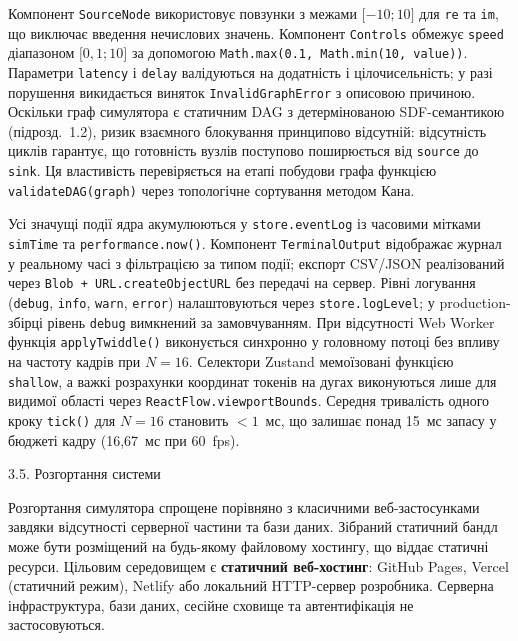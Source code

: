 \documentclass[
]{article}
\begin{document}
Компонент \texttt{SourceNode} використовує повзунки з межами
\(\lbrack - 10;10\rbrack\) для \texttt{re} та \texttt{im}, що виключає
введення нечислових значень. Компонент \texttt{Controls} обмежує
\texttt{speed} діапазоном \(\lbrack 0,1;10\rbrack\) за допомогою
\texttt{Math.max}\texttt{(0.1,\ }\texttt{Math.min}\texttt{(10,\ }\texttt{value}\texttt{))}.
Параметри \texttt{latency} і \texttt{delay} валідуються на додатність і
цілочисельність; у разі порушення викидається виняток
\texttt{InvalidGraphError} з описовою причиною. Оскільки граф симулятора
є статичним DAG з детермінованою SDF-семантикою (підрозд.~1.2), ризик
взаємного блокування принципово відсутній: відсутність циклів гарантує,
що готовність вузлів поступово поширюється від \texttt{source} до
\texttt{sink}. Ця властивість перевіряється на етапі побудови графа
функцією \texttt{validateDAG}\texttt{(}\texttt{graph}\texttt{)} через
топологічне сортування методом Кана.

Усі значущі події ядра акумулюються у \texttt{store.eventLog} із
часовими мітками \texttt{simTime} та
\texttt{performance.now}\texttt{()}. Компонент \texttt{TerminalOutput}
відображає журнал у реальному часі з фільтрацією за типом події; експорт
CSV/JSON реалізований через
\texttt{Blob}\texttt{\ +\ }\texttt{URL.createObjectURL} без передачі на
сервер. Рівні логування (\texttt{debug}, \texttt{info}, \texttt{warn},
\texttt{error}) налаштовуються через \texttt{store.logLevel}; у
production-збірці рівень \texttt{debug} вимкнений за замовчуванням. При
відсутності Web Worker функція \texttt{applyTwiddle}\texttt{()}
виконується синхронно у головному потоці без впливу на частоту кадрів
при \(N = 16\). Селектори Zustand мемоїзовані функцією \texttt{shallow},
а важкі розрахунки координат токенів на дугах
виконуються лише для видимої області через
\texttt{ReactFlow.viewportBounds}. Середня тривалість одного кроку
\texttt{tick}\texttt{()} для \(N = 16\) становить \(< 1\)~мс, що залишає
понад 15~мс запасу у бюджеті кадру (16,67~мс при 60~fps).

\protect{}\label{_Toc229681152}{}3.5. Розгортання системи

Розгортання симулятора спрощене порівняно з класичними веб-застосунками
завдяки відсутності серверної частини та бази даних. Зібраний статичний
бандл може бути розміщений на будь-якому файловому хостингу, що віддає
статичні ресурси. Цільовим середовищем є \textbf{статичний веб-хостинг}:
GitHub Pages, Vercel (статичний режим), Netlify або локальний
HTTP-сервер розробника. Серверна інфраструктура, бази даних, сесійне
сховище та автентифікація не застосовуються.
\end{document}
